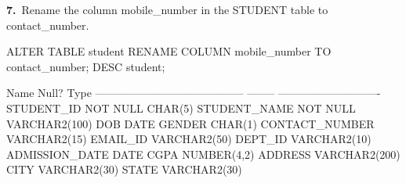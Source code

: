 
\noindent\begin{minipage}{\linewidth}
\begingroup{}
{\fontsize{14}{17}\selectfont\textbf{7.}}\ Rename the column mobile\_number in the STUDENT table to contact\_number.\par
\endgroup\vspace{12pt}


\begin{sqlcode}
ALTER TABLE student RENAME COLUMN mobile_number TO contact_number;
DESC student;
\end{sqlcode}

\vspace{18pt}


\begin{sqlout}
 Name                                      Null?    Type
 ----------------------------------------- -------- ----------------------------
 STUDENT_ID                                NOT NULL CHAR(5)
 STUDENT_NAME                              NOT NULL VARCHAR2(100)
 DOB                                                DATE
 GENDER                                             CHAR(1)
 CONTACT_NUMBER                                     VARCHAR2(15)
 EMAIL_ID                                           VARCHAR2(50)
 DEPT_ID                                            VARCHAR2(10)
 ADMISSION_DATE                                     DATE
 CGPA                                               NUMBER(4,2)
 ADDRESS                                            VARCHAR2(200)
 CITY                                               VARCHAR2(30)
 STATE                                              VARCHAR2(30)
\end{sqlout}
\end{minipage}\par\vspace{30pt}

